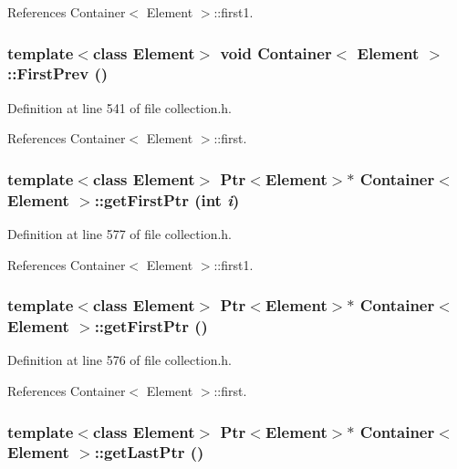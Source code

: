 References Container$<$ Element $>$::first1.\hypertarget{classContainer_2be8f87e042ee57db8b1defb95e99ff2}{
\subsubsection[{FirstPrev}]{\setlength{\rightskip}{0pt plus 5cm}template$<$class Element$>$ void {\bf Container}$<$ Element $>$::FirstPrev ()}}
\label{classContainer_2be8f87e042ee57db8b1defb95e99ff2}




Definition at line 541 of file collection.h.

References Container$<$ Element $>$::first.\hypertarget{classContainer_a2a2567f909060ce9fd33ef25bfbe2cb}{
\subsubsection[{getFirstPtr}]{\setlength{\rightskip}{0pt plus 5cm}template$<$class Element$>$ {\bf Ptr}$<$Element$>$$\ast$ {\bf Container}$<$ Element $>$::getFirstPtr (int {\em i})}}
\label{classContainer_a2a2567f909060ce9fd33ef25bfbe2cb}




Definition at line 577 of file collection.h.

References Container$<$ Element $>$::first1.\hypertarget{classContainer_e2e40811d9c94c5655c21eec097c3c3c}{
\subsubsection[{getFirstPtr}]{\setlength{\rightskip}{0pt plus 5cm}template$<$class Element$>$ {\bf Ptr}$<$Element$>$$\ast$ {\bf Container}$<$ Element $>$::getFirstPtr ()}}
\label{classContainer_e2e40811d9c94c5655c21eec097c3c3c}




Definition at line 576 of file collection.h.

References Container$<$ Element $>$::first.\hypertarget{classContainer_cd55bbaf66ebd95774e796d878dbdf7b}{
\subsubsection[{getLastPtr}]{\setlength{\rightskip}{0pt plus 5cm}template$<$class Element$>$ {\bf Ptr}$<$Element$>$$\ast$ {\bf Container}$<$ Element $>$::getLastPtr ()}}
\label{classContainer_cd55bbaf66ebd95774e796d878dbdf7b}




